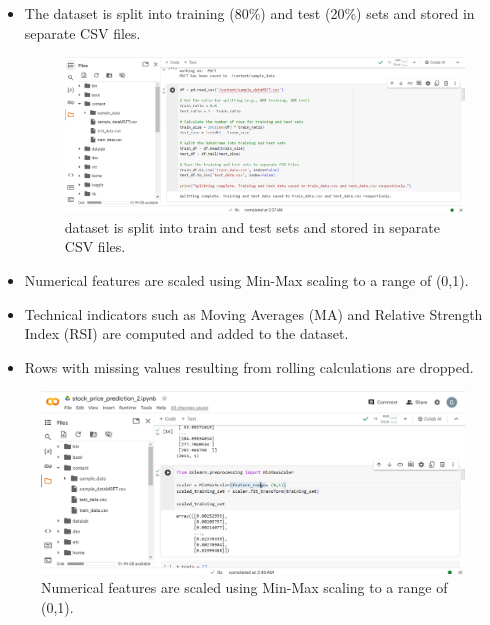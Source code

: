 \documentclass{article}
\begin{document}
\begin{itemize}
  \item The dataset is split into training (80\%) and test (20\%) sets and stored in separate CSV files.

\begin{figure}
    \centering
    \includegraphics[width=1\linewidth]{Capture3.PNG}
    \caption{dataset is split into train and test sets and stored in
separate CSV files.}
    \label{fig:enter-label}
\end{figure}
\end{itemize}

 

\begin{itemize}
 \item Numerical features are scaled using Min-Max scaling to a range of (0,1).
 \end{itemize}
 
 \begin{itemize}
 \item Technical indicators such as Moving Averages (MA) and Relative Strength
Index (RSI) are computed and added to the dataset.
  \end{itemize}

   \begin{itemize}
 \item Rows with missing values resulting from rolling calculations are dropped.
  \end{itemize}
  
 

  \begin{figure}
    \centering
    \includegraphics[width=1\linewidth]{Capture6.PNG}
    \caption{Numerical features are scaled using Min-Max scaling to a range of (0,1).}
    \label{fig:enter-label}
\end{figure}
\end{document}
